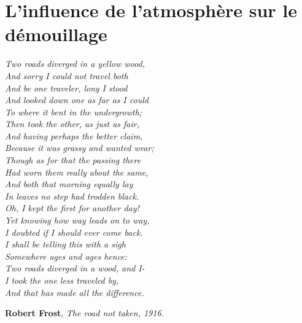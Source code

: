 \documentclass[12pt,french,twoside,openright]{report}
\begin{document}
\chapter{L'influence de l'atmosphère sur le démouillage}
\begin{flushleft}
\textit{
Two roads diverged in a yellow wood,\\
And sorry I could not travel both\\
And be one traveler, long I stood\\
And looked down one as far as I could\\
To where it bent in the undergrowth;\\
\vspace{12pt}
Then took the other, as just as fair,\\
And having perhaps the better claim,\\
Because it was grassy and wanted wear;\\
Though as for that the passing there\\
Had worn them really about the same,\\
\vspace{12pt}
And both that morning equally lay\\
In leaves no step had trodden black.\\
Oh, I kept the first for another day!\\
Yet knowing how way leads on to way,\\
I doubted if I should ever come back.\\
\vspace{12pt}
I shall be telling this with a sigh\\
Somewhere ages and ages hence:\\
Two roads diverged in a wood, and I-\\
I took the one less traveled by,\\
And that has made all the difference.}
\end{flushleft}
\begin{flushright}
\textbf{Robert Frost}, \textit{The road not taken, 1916.}
\end{flushright}
\newpage


\end{document}

